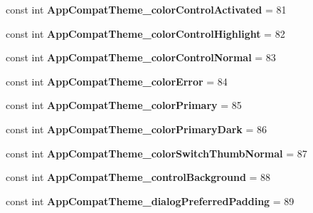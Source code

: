 \begin{DoxyCompactItemize}
const int {\bfseries App\+Compat\+Theme\+\_\+color\+Control\+Activated} = 81
\item 
\mbox{\label{classst_delivery_1_1_resource_1_1_styleable_ab560a94849883b931cb598f3bd6f5589}} 
const int {\bfseries App\+Compat\+Theme\+\_\+color\+Control\+Highlight} = 82
\item 
\mbox{\label{classst_delivery_1_1_resource_1_1_styleable_aa835ece9544aa97462a233b99ea9076b}} 
const int {\bfseries App\+Compat\+Theme\+\_\+color\+Control\+Normal} = 83
\item 
\mbox{\label{classst_delivery_1_1_resource_1_1_styleable_ad333fb71f13a697712d6ef5de15eeebc}} 
const int {\bfseries App\+Compat\+Theme\+\_\+color\+Error} = 84
\item 
\mbox{\label{classst_delivery_1_1_resource_1_1_styleable_a8fcfcc7339c40468a4471fb325949439}} 
const int {\bfseries App\+Compat\+Theme\+\_\+color\+Primary} = 85
\item 
\mbox{\label{classst_delivery_1_1_resource_1_1_styleable_a08163b792db30becd53c44194dae8a74}} 
const int {\bfseries App\+Compat\+Theme\+\_\+color\+Primary\+Dark} = 86
\item 
\mbox{\label{classst_delivery_1_1_resource_1_1_styleable_a005254cc57083dcb1d17c87a9099e895}} 
const int {\bfseries App\+Compat\+Theme\+\_\+color\+Switch\+Thumb\+Normal} = 87
\item 
\mbox{\label{classst_delivery_1_1_resource_1_1_styleable_aa8bc27b46f78e4789e37882fd3861fe2}} 
const int {\bfseries App\+Compat\+Theme\+\_\+control\+Background} = 88
\item 
\mbox{\label{classst_delivery_1_1_resource_1_1_styleable_ab2e1739cbd0b7ef2b587c0563e9664f9}} 
const int {\bfseries App\+Compat\+Theme\+\_\+dialog\+Preferred\+Padding} = 89
\item 
\mbox{\label{classst_delivery_1_1_resource_1_1_styleable_a6927ccc3b2a6a274cf44b2f5da78b0c6}} 

\end{DoxyCompactItemize}

